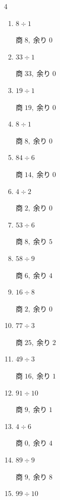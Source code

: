 \begin{multicols}{4}
\begin{enumerate}
        $商\; 29,\; 余り\; 0$

  \item $8 \div 1$

        $商\; 8,\; 余り\; 0$

  \item $33 \div 1$

        $商\; 33,\; 余り\; 0$

  \item $19 \div 1$

        $商\; 19,\; 余り\; 0$

  \item $8 \div 1$

        $商\; 8,\; 余り\; 0$

  \item $84 \div 6$

        $商\; 14,\; 余り\; 0$

  \item $4 \div 2$

        $商\; 2,\; 余り\; 0$

  \item $53 \div 6$

        $商\; 8,\; 余り\; 5$

  \item $58 \div 9$

        $商\; 6,\; 余り\; 4$

  \item $16 \div 8$

        $商\; 2,\; 余り\; 0$

  \item $77 \div 3$

        $商\; 25,\; 余り\; 2$

  \item $49 \div 3$

        $商\; 16,\; 余り\; 1$

  \item $91 \div 10$

        $商\; 9,\; 余り\; 1$

\columnbreak %

  \item $4 \div 6$

        $商\; 0,\; 余り\; 4$

  \item $89 \div 9$

        $商\; 9,\; 余り\; 8$

  \item $99 \div 10$


\end{enumerate}
\end{multicols}
